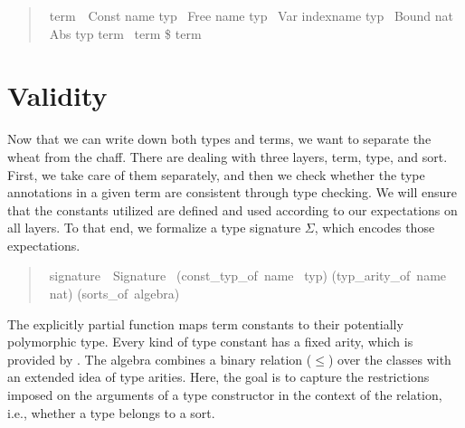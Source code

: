 \begin{quote}
    \begin{isabelle}
        \ term\ {\isacharequal}\ Const name typ\isanewline
        \isaindent{\ \ }{\isacharbar}\ Free name typ\isanewline
        \isaindent{\ \ }{\isacharbar}\ Var indexname typ\isanewline
        \isaindent{\ \ }{\isacharbar}\ Bound nat\isanewline
        \isaindent{\ \ }{\isacharbar}\ Abs typ term\isanewline
        \isaindent{\ \ }{\isacharbar}\ term \$ term
    \end{isabelle}
\end{quote}

\section{Validity}
\label{sec:validity}

Now that we can write down both types and terms, we want to separate the wheat from the chaff.
There are dealing with three layers, term, type, and sort.
First, we take care of them separately, and then we check whether the type annotations in a given term are consistent through type checking.
We will ensure that the constants utilized are defined and used according to our expectations on all layers.
To that end, we formalize a type signature \(\Sigma\), which encodes those expectations.

\begin{quote}
    \begin{isabelle}
        \ signature\ {\isacharequal}\ Signature\ \isanewline
        \isaindent{\ \ }(const\_typ\_of{\isacharcolon}\ name \isasymrightharpoonup\ typ)\isanewline
        \isaindent{\ \ }(typ\_arity\_of{\isacharcolon}\ name \isasymrightharpoonup\ nat)\isanewline
        \isaindent{\ \ }(sorts\_of{\isacharcolon}\ algebra)
    \end{isabelle}
\end{quote}

The explicitly partial  function  maps term constants to their potentially polymorphic type.
Every kind of type constant has a fixed arity, which is provided by .
The algebra combines a binary relation (\(\leq\)) over the classes with an extended idea of type arities.
Here, the goal is to capture the restrictions imposed on the arguments of a type constructor in the context of the  relation, i.e., whether a type belongs to a sort.

